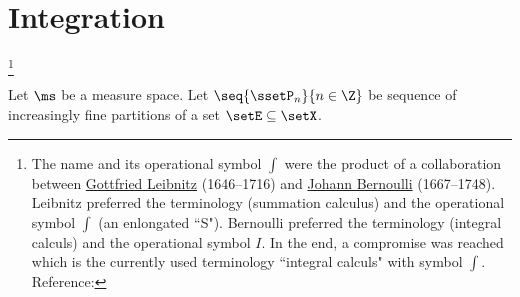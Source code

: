 ﻿%


\chapter{Integration}


\footnote{The name  and its operational symbol $\int$ were the 
  product of a collaboration between 
  \href{http://en.wikipedia.org/wiki/Gottfried_Leibniz}{Gottfried Leibnitz} (1646--1716) 
  and \href{http://en.wikipedia.org/wiki/Johann_Bernoulli}{Johann Bernoulli} (1667--1748).
  Leibnitz preferred the terminology  (summation calculus)
  and the operational symbol $\int$ (an enlongated ``S").
  Bernoulli preferred the terminology  (integral calculs)
  and the operational symbol $I$.
  In the end, a compromise was reached which is the currently used terminology 
  ``integral calculs" with symbol $\int$.
  Reference: 
  }
\begin{definition}
\label{def:cintop}
Let $\ms$ be a measure space.
Let $\seq{\ssetP_n}{n\in\Z}$ be sequence of increasingly fine partitions 
of a set $\setE\subseteq\setX$.
\end{definition}

